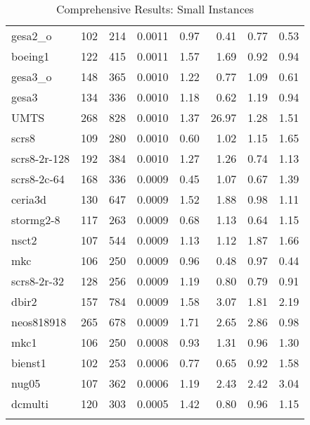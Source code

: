 \documentclass[10pt]{article}
\begin{document}
\begin{longtable}{|l|r|r|r|r|r|r|r|}
gesa2\_o	&	102	&	214	&	0.0011	&	0.97	&	0.41	&	0.77	&	0.53	\\
boeing1	&	122	&	415	&	0.0011	&	1.57	&	1.69	&	0.92	&	0.94	\\
gesa3\_o	&	148	&	365	&	0.0010	&	1.22	&	0.77	&	1.09	&	0.61	\\
gesa3	&	134	&	336	&	0.0010	&	1.18	&	0.62	&	1.19	&	0.94	\\
UMTS	&	268	&	828	&	0.0010	&	1.37	&	26.97	&	1.28	&	1.51	\\
scrs8	&	109	&	280	&	0.0010	&	0.60	&	1.02	&	1.15	&	1.65	\\
scrs8-2r-128	&	192	&	384	&	0.0010	&	1.27	&	1.26	&	0.74	&	1.13	\\
scrs8-2c-64	&	168	&	336	&	0.0009	&	0.45	&	1.07	&	0.67	&	1.39	\\
ceria3d	&	130	&	647	&	0.0009	&	1.52	&	1.88	&	0.98	&	1.11	\\
stormg2-8	&	117	&	263	&	0.0009	&	0.68	&	1.13	&	0.64	&	1.15	\\
nsct2	&	107	&	544	&	0.0009	&	1.13	&	1.12	&	1.87	&	1.66	\\
mkc	&	106	&	250	&	0.0009	&	0.96	&	0.48	&	0.97	&	0.44	\\
scrs8-2r-32	&	128	&	256	&	0.0009	&	1.19	&	0.80	&	0.79	&	0.91	\\
dbir2	&	157	&	784	&	0.0009	&	1.58	&	3.07	&	1.81	&	2.19	\\
neos818918	&	265	&	678	&	0.0009	&	1.71	&	2.65	&	2.86	&	0.98	\\
mkc1	&	106	&	250	&	0.0008	&	0.93	&	1.31	&	0.96	&	1.30	\\
bienst1	&	102	&	253	&	0.0006	&	0.77	&	0.65	&	0.92	&	1.58	\\
nug05	&	107	&	362	&	0.0006	&	1.19	&	2.43	&	2.42	&	3.04	\\
dcmulti	&	120	&	303	&	0.0005	&	1.42	&	0.80	&	0.96	&	1.15	\\
\hline
\caption{Comprehensive Results: Small Instances}
\small
\centering
\label{supptab:all_small}
\end{longtable}
\end{document}
